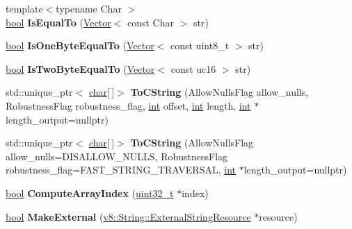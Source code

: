 \begin{DoxyCompactItemize}
{\footnotesize template$<$typename Char $>$ }\\\mbox{\hyperlink{classbool}{bool}} {\bfseries Is\+Equal\+To} (\mbox{\hyperlink{classv8_1_1internal_1_1Vector}{Vector}}$<$ const Char $>$ str)
\item 
\mbox{\label{classv8_1_1internal_1_1String_a389361bf57fdc47c2955e0f36affd458}} 
\mbox{\hyperlink{classbool}{bool}} {\bfseries Is\+One\+Byte\+Equal\+To} (\mbox{\hyperlink{classv8_1_1internal_1_1Vector}{Vector}}$<$ const uint8\+\_\+t $>$ str)
\item 
\mbox{\label{classv8_1_1internal_1_1String_a92b45dd0f7a9ab49cc053cf0e913e108}} 
\mbox{\hyperlink{classbool}{bool}} {\bfseries Is\+Two\+Byte\+Equal\+To} (\mbox{\hyperlink{classv8_1_1internal_1_1Vector}{Vector}}$<$ const uc16 $>$ str)
\item 
\mbox{\label{classv8_1_1internal_1_1String_a540d791fa7a0b6b51b3c84cf4312c3a3}} 
std\+::unique\+\_\+ptr$<$ \mbox{\hyperlink{classchar}{char}}\mbox{[}$\,$\mbox{]}$>$ {\bfseries To\+C\+String} (Allow\+Nulls\+Flag allow\+\_\+nulls, Robustness\+Flag robustness\+\_\+flag, \mbox{\hyperlink{classint}{int}} offset, \mbox{\hyperlink{classint}{int}} length, \mbox{\hyperlink{classint}{int}} $\ast$length\+\_\+output=nullptr)
\item 
\mbox{\label{classv8_1_1internal_1_1String_a3a92740f164e0725793dd049befceed7}} 
std\+::unique\+\_\+ptr$<$ \mbox{\hyperlink{classchar}{char}}\mbox{[}$\,$\mbox{]}$>$ {\bfseries To\+C\+String} (Allow\+Nulls\+Flag allow\+\_\+nulls=D\+I\+S\+A\+L\+L\+O\+W\+\_\+\+N\+U\+L\+LS, Robustness\+Flag robustness\+\_\+flag=F\+A\+S\+T\+\_\+\+S\+T\+R\+I\+N\+G\+\_\+\+T\+R\+A\+V\+E\+R\+S\+AL, \mbox{\hyperlink{classint}{int}} $\ast$length\+\_\+output=nullptr)
\item 
\mbox{\label{classv8_1_1internal_1_1String_a46b7030df3a7c7205e72ba4bc2eb3fdc}} 
\mbox{\hyperlink{classbool}{bool}} {\bfseries Compute\+Array\+Index} (\mbox{\hyperlink{classuint32__t}{uint32\+\_\+t}} $\ast$index)
\item 
\mbox{\label{classv8_1_1internal_1_1String_a8b6bd85bd67adbe826a3743eb67f180d}} 
\mbox{\hyperlink{classbool}{bool}} {\bfseries Make\+External} (\mbox{\hyperlink{classv8_1_1String_1_1ExternalStringResource}{v8\+::\+String\+::\+External\+String\+Resource}} $\ast$resource)

\end{DoxyCompactItemize}
